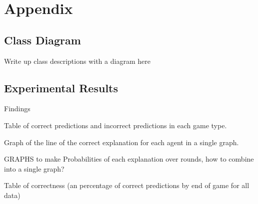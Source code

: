 \documentclass[parskip]{cs4rep}
\begin{document}
\chapter{Appendix}

\section{Class Diagram}

Write up class descriptions with a diagram here

\section{Experimental Results}

Findings

Table of correct predictions and incorrect predictions in each game type.

Graph of the line of the correct explanation for each agent in a single graph.

GRAPHS to make
Probabilities of each explanation over rounds, how to combine into a single graph?

Table of correctness (an percentage of correct predictions by end of game for all data)



\end{document}
